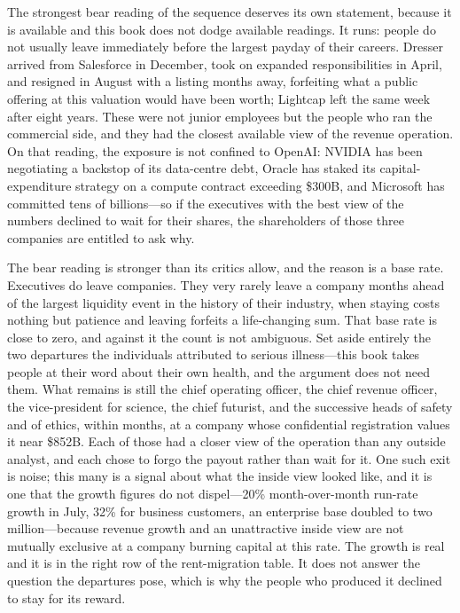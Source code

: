 The strongest bear reading of the sequence deserves its own statement, because it is available and this book does not dodge available readings. It runs: people do not usually leave immediately before the largest payday of their careers. Dresser arrived from Salesforce in December, took on expanded responsibilities in April, and resigned in August with a listing months away, forfeiting what a public offering at this valuation would have been worth; Lightcap left the same week after eight years. These were not junior employees but the people who ran the commercial side, and they had the closest available view of the revenue operation. On that reading, the exposure is not confined to OpenAI: NVIDIA has been negotiating a backstop of its data-centre debt, Oracle has staked its capital-expenditure strategy on a compute contract exceeding \$300B, and Microsoft has committed tens of billions---so if the executives with the best view of the numbers declined to wait for their shares, the shareholders of those three companies are entitled to ask why.

The bear reading is stronger than its critics allow, and the reason is a base rate. Executives do leave companies. They very rarely leave a company months ahead of the largest liquidity event in the history of their industry, when staying costs nothing but patience and leaving forfeits a life-changing sum. That base rate is close to zero, and against it the count is not ambiguous. Set aside entirely the two departures the individuals attributed to serious illness---this book takes people at their word about their own health, and the argument does not need them. What remains is still the chief operating officer, the chief revenue officer, the vice-president for science, the chief futurist, and the successive heads of safety and of ethics, within months, at a company whose confidential registration values it near \$852B. Each of those had a closer view of the operation than any outside analyst, and each chose to forgo the payout rather than wait for it. One such exit is noise; this many is a signal about what the inside view looked like, and it is one that the growth figures do not dispel---20\% month-over-month run-rate growth in July, 32\% for business customers, an enterprise base doubled to two million---because revenue growth and an unattractive inside view are not mutually exclusive at a company burning capital at this rate. The growth is real and it is in the right row of the rent-migration table. It does not answer the question the departures pose, which is why the people who produced it declined to stay for its reward.

